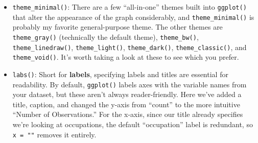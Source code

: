 \documentclass[
  letterpaper,
]{book}
\begin{document}
\begin{itemize}
\item
  \texttt{theme\_minimal()}: There are a few ``all-in-one'' themes built
  into \texttt{ggplot()} that alter the appearance of the graph
  considerably, and \texttt{theme\_minimal()} is probably my favorite
  general-purpose theme. The other themes are \texttt{theme\_gray()}
  (technically the default theme), \texttt{theme\_bw()},
  \texttt{theme\_linedraw()}, \texttt{theme\_light()},
  \texttt{theme\_dark()}, \texttt{theme\_classic()}, and
  \texttt{theme\_void()}. It's worth taking a look at these to see which
  you prefer.
\item
  \texttt{labs()}: Short for \textbf{labels}, specifying labels and
  titles are essential for readability. By default, \texttt{ggplot()}
  labels axes with the variable names from your dataset, but these
  aren't always reader-friendly. Here we've added a title, caption, and
  changed the y-axis from ``count'' to the more intuitive ``Number of
  Observations.'' For the x-axis, since our title already specifies
  we're looking at occupations, the default ``occupation'' label is
  redundant, so \texttt{x\ =\ ""} removes it entirely.
\end{itemize}
\end{document}
